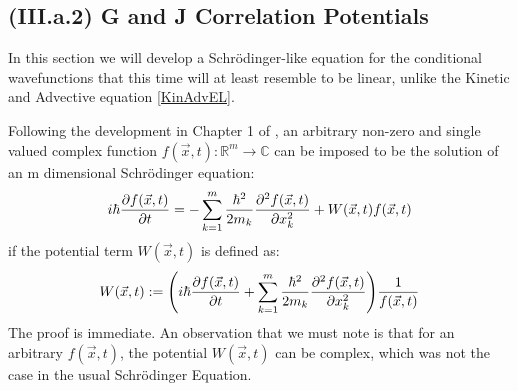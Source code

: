 \documentclass[11pt, a4paper]{article} %
\newcommand{\R}{\mathbb{R}} %
\newcommand{\C}{\mathbb{C}}
\begin{document}


\subsection*{(III.a.2) G and J Correlation Potentials}
In this section we will develop a Schrödinger-like equation for the conditional wavefunctions that this time will at least resemble to be linear, unlike the Kinetic and Advective equation \eqref{KinAdvEL}.

Following the development in Chapter 1 of \cite{JordiXO}, an arbitrary non-zero and single valued complex function $f(\vec{x}, t):\R^m \rightarrow \C$ can be imposed to be the solution of an m dimensional Schrödinger equation:
\begin{equation}
i \hbar \pdv{f(\vec{x},t)}{t} = -\sum_{k=1}^m\frac{\hbar^2}{2 m_k}\pdv[2]{f(\vec{x},t)}{x_k} + W(\vec{x},t) f(\vec{x},t)
\end{equation}
if the potential term $W(\vec{x}, t)$ is defined as:
\begin{equation}
W(\vec{x}, t) := \qty(i \hbar \pdv{f(\vec{x},t)}{t} +\sum_{k=1}^m\frac{\hbar^2}{2 m_k}\pdv[2]{f(\vec{x},t)}{x_k} ) \frac{1}{f(\vec{x},t)}
\end{equation}
The proof is immediate. An observation that we must note is that for an arbitrary $f(\vec{x},t)$, the potential $W(\vec{x},t)$ can be complex, which was not the case in the usual Schrödinger Equation.
\end{document}
